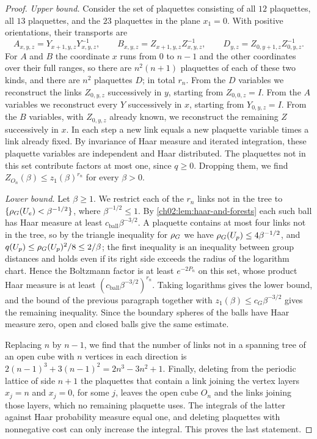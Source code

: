 \begin{proof}
\emph{Upper bound.} Consider the set of plaquettes consisting of all $12$ plaquettes, all $13$ plaquettes, and the $23$ plaquettes in the plane $x_1=0$. With positive orientations, their transports are
\[
 A_{x,y,z}=Y_{x+1,y,z}Y_{x,y,z}^{-1},\qquad B_{x,y,z}=Z_{x+1,y,z}Z_{x,y,z}^{-1},\qquad D_{y,z}=Z_{0,y+1,z}Z_{0,y,z}^{-1}.
\]
For $A$ and $B$ the coordinate $x$ runs from $0$ to $n-1$ and the other coordinates over their full ranges, so there are $n^2(n+1)$ plaquettes of each of these two kinds, and there are $n^2$ plaquettes $D$; in total $r_n$. From the $D$ variables we reconstruct the links $Z_{0,y,z}$ successively in $y$, starting from $Z_{0,0,z}=I$. From the $A$ variables we reconstruct every $Y$ successively in $x$, starting from $Y_{0,y,z}=I$. From the $B$ variables, with $Z_{0,y,z}$ already known, we reconstruct the remaining $Z$ successively in $x$. In each step a new link equals a new plaquette variable times a link already fixed. By invariance of Haar measure and iterated integration, these plaquette variables are independent and Haar distributed. The plaquettes not in this set contribute factors at most one, since $q\ge0$. Dropping them, we find $Z_{O_n}(\beta)\le z_1(\beta)^{r_n}$ for every $\beta>0$.

\emph{Lower bound.} Let $\beta\ge1$. We restrict each of the $r_n$ links not in the tree to $\{\rho_G(U_e)<\beta^{-1/2}\}$, where $\beta^{-1/2}\le1$. By \cref{ch02:lem:haar-and-forests} each such ball has Haar measure at least $c_{\mathrm{ball}}\beta^{-3/2}$. A plaquette contains at most four links not in the tree, so by the triangle inequality for $\rho_G$ we have $\rho_G(U_p)\le4\beta^{-1/2}$, and $q(U_p)\le\rho_G(U_p)^2/8\le2/\beta$; the first inequality is an inequality between group distances and holds even if its right side exceeds the radius of the logarithm chart. Hence the Boltzmann factor is at least $e^{-2P_n}$ on this set, whose product Haar measure is at least $(c_{\mathrm{ball}}\beta^{-3/2})^{r_n}$. Taking logarithms gives the lower bound, and the bound of the previous paragraph together with $z_1(\beta)\le c_G\beta^{-3/2}$ gives the remaining inequality. Since the boundary spheres of the balls have Haar measure zero, open and closed balls give the same estimate.

Replacing $n$ by $n-1$, we find that the number of links not in a spanning tree of an open cube with $n$ vertices in each direction is $2(n-1)^3+3(n-1)^2=2n^3-3n^2+1$. Finally, deleting from the periodic lattice of side $n+1$ the plaquettes that contain a link joining the vertex layers $x_j=n$ and $x_j=0$, for some $j$, leaves the open cube $O_n$ and the links joining those layers, which no remaining plaquette uses. The integrals of the latter against Haar probability measure equal one, and deleting plaquettes with nonnegative cost can only increase the integral. This proves the last statement.
\end{proof}

